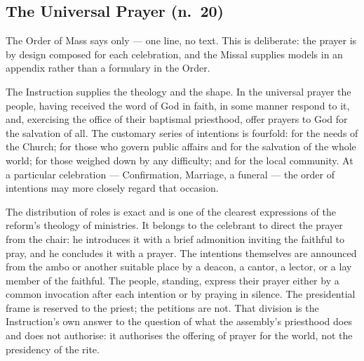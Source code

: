 \subsection{The Universal Prayer (n.\ 20)}

The Order of Mass says only  --- one
line, no text. This is deliberate: the prayer is by design composed for each celebration, and
the Missal supplies models in an appendix rather than a formulary in the Order.

The Instruction supplies the theology and the shape. In the universal prayer the people, having
received the word of God in faith, in some manner respond to it, and, exercising the office of
their baptismal priesthood, offer prayers to God for the salvation of all. The
customary series of intentions is fourfold: for the needs of the Church; for those who govern
public affairs and for the salvation of the whole world; for those weighed down by any
difficulty; and for the local community. At a particular celebration --- Confirmation,
Marriage, a funeral --- the order of intentions may more closely regard that
occasion.

The distribution of roles is exact and is one of the clearest expressions of the reform's
theology of ministries. It belongs to the celebrant to direct the prayer from the chair: he
introduces it with a brief admonition inviting the faithful to pray, and he concludes it with a
prayer. The intentions themselves are announced from the ambo or another suitable place by a
deacon, a cantor, a lector, or a lay member of the faithful. The people, standing, express their
prayer either by a common invocation after each intention or by praying in
silence.
The presidential frame is reserved to the priest; the petitions are not. That division is the
Instruction's own answer to the question of what the assembly's priesthood does and does not
authorise: it authorises the offering of prayer for the world, not the presidency of the rite.

